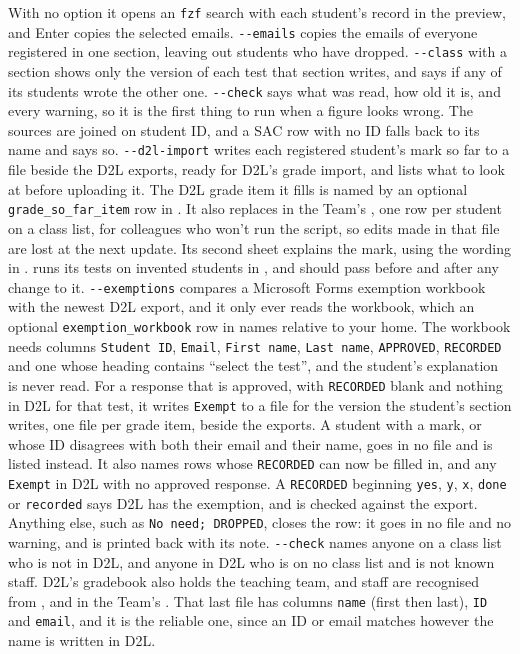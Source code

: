With no option it opens an \texttt{fzf} search with each student's record in the preview, and Enter copies the selected emails.
\texttt{-{}-emails} copies the emails of everyone registered in one section, leaving out students who have dropped.
\texttt{-{}-class} with a section shows only the version of each test that section writes, and says if any of its students wrote the other one.
\texttt{-{}-check} says what was read, how old it is, and every warning, so it is the first thing to run when a figure looks wrong.
The sources are joined on student ID, and a SAC row with no ID falls back to its name and says so.
\texttt{-{}-d2l-import} writes each registered student's mark so far to a file beside the D2L exports, ready for D2L's grade import, and lists what to look at before uploading it.
The D2L grade item it fills is named by an optional \texttt{grade\_so\_far\_item} row in .
It also replaces  in the Team's , one row per student on a class list, for colleagues who won't run the script, so edits made in that file are lost at the next update.
Its second sheet explains the mark, using the wording in .
 runs its tests on invented students in , and should pass before and after any change to it.
\texttt{-{}-exemptions} compares a Microsoft Forms exemption workbook with the newest D2L export, and it only ever reads the workbook, which an optional \texttt{exemption\_workbook} row in  names relative to your home.
The workbook needs columns \texttt{Student ID}, \texttt{Email}, \texttt{First name}, \texttt{Last name}, \texttt{APPROVED}, \texttt{RECORDED} and one whose heading contains ``select the test'', and the student's explanation is never read.
For a response that is approved, with \texttt{RECORDED} blank and nothing in D2L for that test, it writes \texttt{Exempt} to a file for the version the student's section writes, one file per grade item, beside the exports.
A student with a mark, or whose ID disagrees with both their email and their name, goes in no file and is listed instead.
It also names rows whose \texttt{RECORDED} can now be filled in, and any \texttt{Exempt} in D2L with no approved response.
A \texttt{RECORDED} beginning \texttt{yes}, \texttt{y}, \texttt{x}, \texttt{done} or \texttt{recorded} says D2L has the exemption, and is checked against the export.
Anything else, such as \texttt{No need; DROPPED}, closes the row: it goes in no file and no warning, and is printed back with its note.
\texttt{-{}-check} names anyone on a class list who is not in D2L, and anyone in D2L who is on no class list and is not known staff.
D2L's gradebook also holds the teaching team, and staff are recognised from ,  and  in the Team's .
That last file has columns \texttt{name} (first then last), \texttt{ID} and \texttt{email}, and it is the reliable one, since an ID or email matches however the name is written in D2L.

